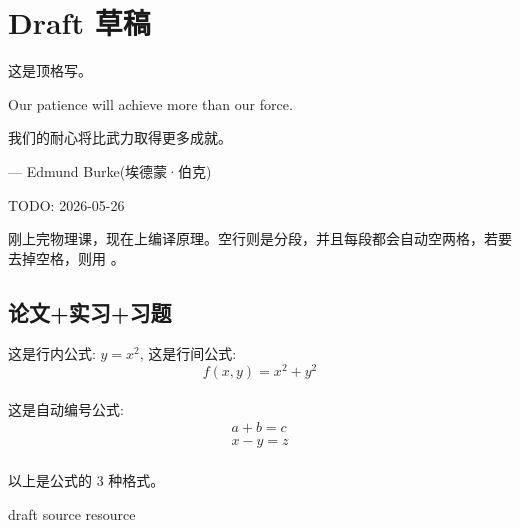 \section{Draft 草稿}
\noindent 这是顶格写。

Our patience will achieve more than our force.

我们的耐心将比武力取得更多成就。\par
\hfill --- Edmund Burke(埃德蒙·伯克)\par
\hfill TODO: 2026-05-26

刚上完物理课，现在上编译原理。空行则是分段，并且每段都会自动空两格，若要去掉空格，则用 \noindent。

\subsection{论文+实习+习题}
这是行内公式: \(y = x^2\), 这是行间公式: 
\[
  f(x, y) = x^2 + y^2
\] \\ 
这是自动编号公式:
\begin{gather}
a + b = c \\
x - y = z
\end{gather} \\
以上是公式的 3 种格式。

draft
source
resource
